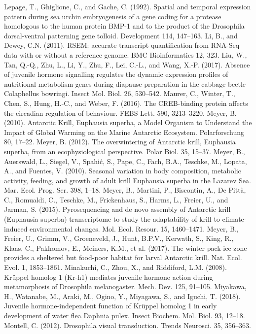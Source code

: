 Lepage, T., Ghiglione, C., and Gache, C. (1992). Spatial and temporal expression pattern during sea urchin embryogenesis of a gene coding for a protease homologous to the human protein BMP-1 and to the product of the Drosophila dorsal-ventral patterning gene tolloid. Development 114, 147–163.
Li, B., and Dewey, C.N. (2011). RSEM: accurate transcript quantification from RNA-Seq data with or without a reference genome. BMC Bioinformatics 12, 323.
Liu, W., Tan, Q.-Q., Zhu, L., Li, Y., Zhu, F., Lei, C.-L., and Wang, X.-P. (2017). Absence of juvenile hormone signalling regulates the dynamic expression profiles of nutritional metabolism genes during diapause preparation in the cabbage beetle Colaphellus bowringi. Insect Mol. Biol. 26, 530–542.
Maurer, C., Winter, T., Chen, S., Hung, H.-C., and Weber, F. (2016). The CREB-binding protein affects the circadian regulation of behaviour. FEBS Lett. 590, 3213–3220.
Meyer, B. (2010). Antarctic Krill, Euphausia superba, a Model Organism to Understand the Impact of Global Warming on the Marine Antarctic Ecosystem. Polarforschung 80, 17–22.
Meyer, B. (2012). The overwintering of Antarctic krill, Euphausia superba, from an ecophysiological perspective. Polar Biol. 35, 15–37.
Meyer, B., Auerswald, L., Siegel, V., Spahić, S., Pape, C., Fach, B.A., Teschke, M., Lopata, A., and Fuentes, V. (2010). Seasonal variation in body composition, metabolic activity, feeding, and growth of adult krill Euphausia superba in the Lazarev Sea. Mar. Ecol. Prog. Ser. 398, 1–18.
Meyer, B., Martini, P., Biscontin, A., De Pittà, C., Romualdi, C., Teschke, M., Frickenhaus, S., Harms, L., Freier, U., and Jarman, S. (2015). Pyrosequencing and de novo assembly of Antarctic krill (Euphausia superba) transcriptome to study the adaptability of krill to climate‐induced environmental changes. Mol. Ecol. Resour. 15, 1460–1471.
Meyer, B., Freier, U., Grimm, V., Groeneveld, J., Hunt, B.P.V., Kerwath, S., King, R., Klaas, C., Pakhomov, E., Meiners, K.M., et al. (2017). The winter pack-ice zone provides a sheltered but food-poor habitat for larval Antarctic krill. Nat. Ecol. Evol. 1, 1853–1861.
Minakuchi, C., Zhou, X., and Riddiford, L.M. (2008). Krüppel homolog 1 (Kr-h1) mediates juvenile hormone action during metamorphosis of Drosophila melanogaster. Mech. Dev. 125, 91–105.
Miyakawa, H., Watanabe, M., Araki, M., Ogino, Y., Miyagawa, S., and Iguchi, T. (2018). Juvenile hormone-independent function of Krüppel homolog 1 in early development of water flea Daphnia pulex. Insect Biochem. Mol. Biol. 93, 12–18.
Montell, C. (2012). Drosophila visual transduction. Trends Neurosci. 35, 356–363.

